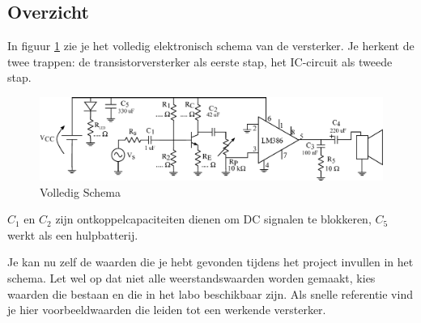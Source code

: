 \documentclass{article}
\begin{document}
	\begin{landscape}
		\section{Overzicht}
				In figuur \ref{fig:volledig_schema} zie je het volledig elektronisch schema van de versterker. Je herkent de twee trappen: de transistorversterker als eerste stap, het IC-circuit als tweede stap. 
				\begin{figure}[htbp]
					\centering
					\includegraphics[width=\linewidth]{volledig_schema}
					\caption{Volledig Schema}
					\label{fig:volledig_schema}
				\end{figure}
				$C_1$ en $C_2$ zijn ontkoppelcapaciteiten dienen om DC signalen te blokkeren, $C_5$ werkt als een hulpbatterij.

				Je kan nu zelf de waarden die je hebt gevonden tijdens het project invullen in het schema. Let wel op dat niet alle weerstandswaarden worden gemaakt, kies waarden die bestaan en die in het labo beschikbaar zijn.
				Als snelle referentie vind je hier voorbeeldwaarden die leiden tot een werkende versterker.

				\begin{center}
					\noindent {}
				\end{center}

	\end{landscape}
\end{document}
